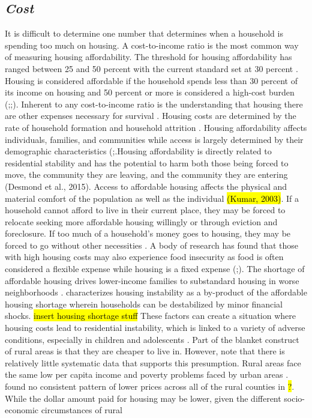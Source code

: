 \subsection{\textit{Cost}}
It is difficult to determine one number that determines when a household is spending too much on housing. A cost-to-income ratio is the most common way of measuring housing affordability. The threshold for housing affordability has ranged between 25 and 50 percent with the current standard set at 30 percent \citep{kropczynski_insights_2012}.  Housing is considered affordable if the household spends less than 30 percent of its income on housing and 50 percent or more is considered a high-cost burden (\citealp{braveman_housing_2011};\citealp{swope_housing_2020};\citealp{weicher_housing_2006}). Inherent to any cost-to-income ratio is the understanding that housing there are other expenses necessary for survival \citep{herbert_measuring_2018}. Housing costs are determined by the rate of household formation and household attrition \citep{pendall_future_2016}.  Housing affordability affects individuals, families, and communities while access is largely determined by their demographic characteristics  (\citealp{braveman_housing_2011};\citealp{yadavalli_comprehensive_2020}.Housing affordability is directly related to residential stability and has the potential to harm both those being forced to move, the community they are leaving, and the community they are entering (Desmond et al., 2015). Access to affordable housing affects the physical and material comfort of the population as well as the individual \hl{(Kumar, 2003)}. If a household cannot afford to live in their current place, they may be forced to relocate seeking more affordable housing willingly or through eviction and foreclosure.  If too much of a household’s money goes to housing, they may be forced to go without other necessities \citep{herbert_measuring_2018}. A body of research has found that those with high housing costs may also experience food insecurity as food is often considered a flexible expense while housing is a fixed expense (\citealp{fletcher_assessing_2009};\citealp{kropczynski_insights_2012}). The shortage of affordable housing drives lower-income families to substandard housing in worse neighborhoods \citep{braveman_housing_2011}. \citet{kang_severe_2021} characterizes housing instability as a by-product of the affordable housing shortage wherein households can be destabilized by minor financial shocks. \hl{insert housing shortage stuff} These factors can create a situation where housing costs lead to residential instability, which is linked to a variety of adverse conditions, especially in children and adolescents \citep{desmond_forced_2015}. Part of the blanket construct of rural areas is that they are cheaper to live in. However, \citep{kurre_is_2003} note that there is relatively little systematic data that supports this presumption. Rural areas face the same low per capita income and poverty problems faced by urban areas \citep{castle_place_2011}. \citep{zimmerman_does_2008} found no consistent pattern of lower prices across all of the rural counties in \hl{?}. While the dollar amount paid for housing may be lower, given the different socio-economic circumstances of rural 